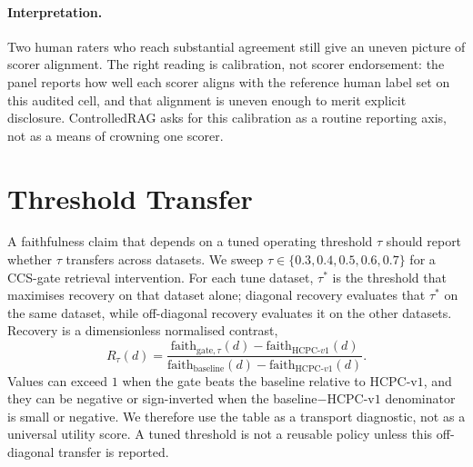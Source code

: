 \paragraph{Interpretation.} Two human raters who reach substantial
agreement still give an uneven picture of scorer alignment. The right
reading is calibration, not scorer endorsement: the panel reports how
well each scorer aligns with the reference human label set on this
audited cell, and that alignment is uneven enough to merit explicit
disclosure. ControlledRAG asks for this calibration as a routine
reporting axis, not as a means of crowning one scorer.

\section{Threshold Transfer}
\label{sec:threshold_transfer}

A faithfulness claim that depends on a tuned operating threshold $\tau$
should report whether $\tau$ transfers across datasets. We sweep
$\tau \in \{0.3, 0.4, 0.5, 0.6, 0.7\}$ for a CCS-gate retrieval
intervention. For each tune dataset, $\tau^\ast$ is the threshold that
maximises recovery on that dataset alone; diagonal recovery evaluates
that $\tau^\ast$ on the same dataset, while off-diagonal recovery
evaluates it on the other datasets. Recovery is a dimensionless
normalised contrast,
\[
R_\tau(d)=
\frac{\mathrm{faith}_{\mathrm{gate},\tau}(d) -
      \mathrm{faith}_{\mathrm{HCPC}\text{-}v1}(d)}
     {\mathrm{faith}_{\mathrm{baseline}}(d) -
      \mathrm{faith}_{\mathrm{HCPC}\text{-}v1}(d)}.
\]
Values can exceed $1$ when the gate beats the baseline relative to
HCPC-v$1$, and they can be negative or sign-inverted when the
baseline$-$HCPC-v$1$ denominator is small or negative. We therefore use
the table as a transport diagnostic, not as a universal utility score.
A tuned threshold is not a reusable policy unless this off-diagonal
transfer is reported.


